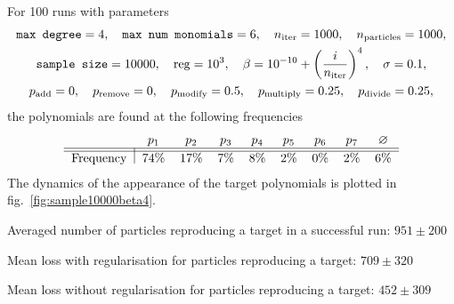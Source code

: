 \documentclass[11pt]{article}
\begin{document}
\begin{enumerate}
	  For 100 runs with parameters
		\begin{equation} \label{eq:sample10000beta4}
			\begin{gathered}
				\texttt{max degree} = 4, \quad \texttt{max num monomials} = 6, \quad n_{\rm iter} = 1000, \quad n_{\rm particles} = 1000, \\
				\texttt{sample size} = 10000, \quad {\rm reg} = 10^{3}, \quad \beta = 10^{-10} + \left(\frac{i}{n_{\rm iter}}\right)^{4}, \quad \sigma = 0.1, \\
				p_{\rm add} = 0, \quad p_{\rm remove} = 0, \quad p_{\rm modify} = 0.5, \quad p_{\rm multiply} = 0.25, \quad p_{\rm divide} = 0.25,
			\end{gathered}
		\end{equation}
		the polynomials are found at the following frequencies
	  \begin{equation}
	  	\begin{tabular}{l|cccccccc}
	  		& $p_{1}$ & $p_{2}$ & $p_{3}$ & $p_{4}$ & $p_{5}$ & $p_{6}$ & $p_{7}$ & $\varnothing$ \\\hline\hline
	  		Frequency & 74\% & 17\% & 7\% & 8\% & 2\% & 0\% & 2\% & 6\%
	  	\end{tabular}
	  \end{equation}
	  The dynamics of the appearance of the target polynomials is plotted in fig.~\ref{fig:sample10000beta4}.

	  Averaged number of particles reproducing a target in a successful run: $951 \pm 200$

	  Mean loss with regularisation for particles reproducing a target: $709 \pm 320$

	  Mean loss without regularisation for particles reproducing a target: $452 \pm 309$


\end{enumerate}
\end{document}
